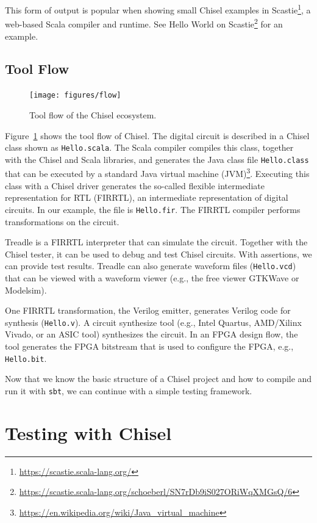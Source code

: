 \documentclass[%
    10pt,
    headinclude, footexclude,
    openright, %
    notitlepage,
    cleardoubleempty,
    headsepline,
    pointlessnumbers,
    bibtotoc, idxtotoc,
    ]{scrbook}
\newcommand{\code}[1]{{\small{\texttt{#1}}}}
\newcommand{\myref}[2]{\href{#1}{#2}}
\renewcommand{\myref}[2]{{#2}{\footnote{\url{#1}}}}
\begin{document}
\noindent This form of output is popular when showing small Chisel examples in
\myref{https://scastie.scala-lang.org/}{Scastie}, a web-based Scala compiler and runtime.
See
\myref{https://scastie.scala-lang.org/schoeberl/SN7rDb9iS027ORiWqXMGsQ/6}{Hello World on Scastie}
for an example.


\subsection{Tool Flow}

\begin{figure}
  \centering
  \texttt{[image: figures/flow]}
  \caption{Tool flow of the Chisel ecosystem.}
  \label{fig:flow}
\end{figure}

Figure~\ref{fig:flow} shows the tool flow of Chisel. The digital circuit is described in a Chisel class
shown as \code{Hello.scala}. The Scala compiler compiles this class, together with the Chisel and Scala
libraries, and generates the Java class file \code{Hello.class} that can be executed by a standard
\myref{https://en.wikipedia.org/wiki/Java_virtual_machine}{Java virtual machine (JVM)}.
Executing this class with a Chisel driver generates the so-called flexible intermediate representation for
RTL (FIRRTL), an intermediate representation of digital circuits. In our example, the file is \code{Hello.fir}.
The FIRRTL compiler performs transformations on the circuit.

Treadle is a FIRRTL interpreter that can simulate the circuit. Together with the Chisel tester, it can be
used to debug and test Chisel circuits. With assertions, we can provide test results.
Treadle can also generate waveform files (\code{Hello.vcd}) that can be viewed with
a waveform viewer (e.g., the free viewer GTKWave or Modelsim).

One FIRRTL transformation, the Verilog emitter, generates Verilog code for synthesis (\code{Hello.v}).
A circuit synthesize tool (e.g., Intel Quartus, AMD/Xilinx Vivado, or an ASIC tool) synthesizes the circuit.
In an FPGA design flow, the tool generates the FPGA bitstream that is used to configure the FPGA,
e.g., \code{Hello.bit}.

Now that we know the basic structure of a Chisel project and how to compile and run it
with \code{sbt}, we can continue with a simple testing framework.


\section{Testing with Chisel}
\end{document}
